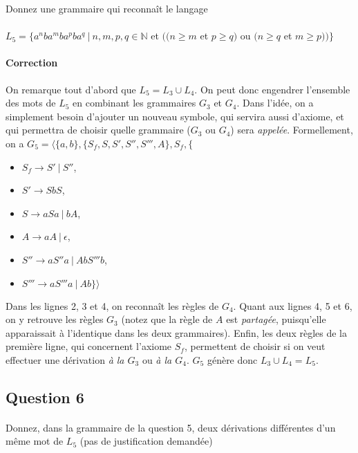 \documentclass{article}[11pt]
\theoremstyle{definition}
\begin{document}
Donnez une grammaire qui reconnaît le langage 

\paragraph*{}$L_5 = \{a^nba^mba^pba^q~|~n,m,p,q \in \mathbb{N}$ et $((n \geq m$ et $p \geq q)$ ou $(n \geq q$ et $m \geq p))\}$

\paragraph*{Correction} On remarque tout d'abord que $L_5 = L_3 \cup L_4$. On peut donc engendrer l'ensemble des mots de $L_5$ en combinant les grammaires $G_3$ et $G_4$. Dans l'idée, on a simplement besoin d'ajouter un nouveau symbole, qui servira aussi d'axiome, et qui permettra de choisir quelle grammaire ($G_3$ ou $G_4$) sera \textit{appelée}. Formellement, on a $G_5 = \big \langle \{a,b\}, \{S_f,S,S',S'',S''',A\},S_f,\{$

\begin{itemize}
\item[] $S_f \rightarrow S'~|~S''$,
\item[] $S' \rightarrow SbS$,
\item[] $S \rightarrow aSa~|~bA$,
\item[] $A \rightarrow aA~|~\epsilon $,
\item[] $S'' \rightarrow aS''a~|~AbS'''b$,
\item[] $S''' \rightarrow aS'''a~|~Ab\}\big \rangle$ 
\end{itemize}
 
\noindent
Dans les lignes 2, 3 et 4, on reconnaît les règles de $G_4$. Quant aux lignes 4, 5 et 6, on y retrouve les règles $G_3$ (notez que la règle de $A$ est \textit{partagée}, puisqu'elle apparaissait à l'identique dans les deux grammaires). Enfin, les deux règles de la première ligne, qui concernent l'axiome $S_f$, permettent de choisir si on veut effectuer une dérivation \textit{à la $G_3$} ou \textit{à la $G_4$}. $G_5$ génère donc $L_3 \cup L_4 = L_5$.


\subsection*{Question 6}

\paragraph*{}Donnez, dans la grammaire de la question 5, deux dérivations différentes d'un même mot de $L_5$ (pas de justification demandée)
\end{document}
